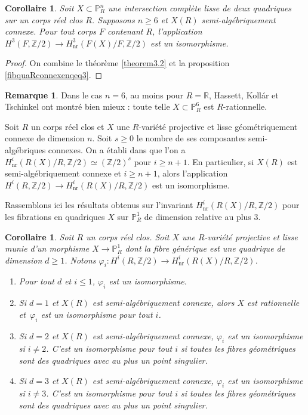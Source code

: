 \documentclass[11pt]{article}
\newenvironment{enumeratea}
{\bgroup\def\theenumi{\alph{enumi}}\begin{enumerate}}
{\end{enumerate}\egroup}
\newtheorem{cor}[thm]{Corollaire}
\theoremstyle{definition}
\newtheorem{rmk}[thm]{Remarque}
\newcommand{\Z}{\mathbb Z}
\newcommand{\R}{\mathbb R}
\renewcommand{\P}{\mathbb P}
\newcommand{\on}[1]{\operatorname{#1}}
\let\phi\varphi
\begin{document}
\begin{cor}
Soit $X \subset \P^n_R$ une intersection complète lisse de deux quadriques sur un corps réel clos $R$. Supposons $n \geq 6$ et $X(R)$ semi-algébriquement connexe.
Pour tout corps $F$ contenant $R$, l'application
$H^3(F,\Z/2) \to H^3_{\on{nr}}(F(X)/F, \Z/2)$ est un isomorphisme.
\end{cor}
\begin{proof}

On combine le théorème \ref{theorem3.2} et la proposition \ref{fibquaRconnexenqeq3}.
\end{proof}

\begin{rmk}
Dans le cas $n=6$, au moins pour $R=\R$, Hassett, Kollár et Tschinkel \cite{hassett2022rationality}
ont montré bien mieux : toute telle $X \subset \P^6_{R}$ est $R$-rationnelle.
\end{rmk}

Soit $R$ un corps réel clos et $X$ une $R$-variété projective et lisse géométriquement connexe de dimension $n$.
Soit $s\geq 0$ le nombre de ses composantes semi-algébriques connexes.
On a établi dans \cite{colliot1990real} que l'on a
$ H^{i}_{\on{nr}}(R(X)/R,\Z/2) \simeq (\Z/2)^s $
pour $i\geq n+1$. En particulier, si $X(R)$ est semi-algébriquement connexe et $i\geq n+1$, alors l'application $H^i(R,\Z/2)\to H^i_{\on{nr}}(R(X)/R,\Z/2)$ est un isomorphisme.

Rassemblons ici les résultats
obtenus sur l'invariant $ H^{i}_{\on{nr}}(R(X)/R,\Z/2)$
pour les fibrations en quadriques $X$ sur $\P^1_R$
de dimension relative au plus $3$.

\begin{cor}
Soit $R$ un corps réel clos.
Soit $X$ une $R$-variété projective et lisse munie d'un
morphisme $X \to \P^1_{R}$ dont la fibre générique est une quadrique de dimension $d\geq 1$.
Notons $\phi_i : H^{i}(R,\Z/2) \to H^{i}_{\on{nr}}(R(X)/R,\Z/2)$.
\begin{enumeratea}
\item
Pour tout $d$ et $i\leq 1$, $\phi_i$ est un isomorphisme.

\item
Si $d=1$ et $X(R)$ est semi-algébriquement connexe,
alors $X$ est rationnelle et~$\phi_i$ est un isomorphisme pour tout $i$.

\item
Si $d=2$ et $X(R)$ est semi-algébriquement connexe,
$\phi_i$ est un isomorphisme si $i\neq 2$. C'est un isomorphisme pour tout $i$ si toutes les fibres géométriques sont des quadriques avec au plus un point singulier.

\item
Si $d=3$ et $X(R)$ est semi-algébriquement connexe, $\phi_i$ est un isomorphisme si $i\neq 3$. C'est un isomorphisme pour tout $i$ si toutes les fibres géométriques sont des quadriques avec au plus un point singulier.
\end{enumeratea}
\end{cor}
\end{document}
